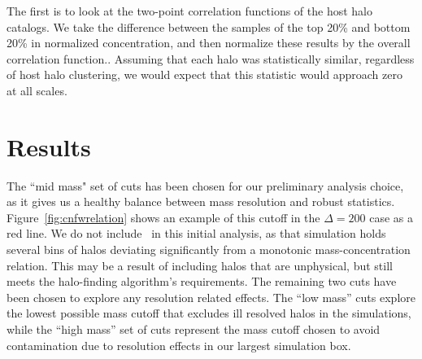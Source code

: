 \documentclass[usenatbib,usegraphicx,letterpaper]{mn2e}
\begin{document}
The first is to look at the two-point correlation functions of the host halo catalogs. We take the difference between the samples of the top 20\% and bottom 20\% in normalized concentration, and then normalize these results by the overall correlation function.. Assuming that each halo was statistically similar, regardless of host halo clustering, we would expect that this statistic would approach zero at all scales.



\section[]{Results}
\label{section:results}

The ``mid mass" set of cuts has been chosen for our preliminary analysis choice, as it gives us a healthy balance between mass resolution and robust statistics. Figure~\ref{fig:cnfwrelation} shows an example of this cutoff in the $\Delta = 200$ case as a red line. 
We do not include \simC \ in this initial analysis, as that simulation holds several bins of halos deviating significantly from a monotonic mass-concentration relation. This may be a result of including halos that are unphysical, but still meets the halo-finding algorithm's requirements.  The remaining two cuts have been chosen to explore any resolution related effects. The ``low mass'' cuts explore the lowest possible mass cutoff that excludes ill resolved halos in the \citet{diemer15} simulations, while the ``high mass'' set of cuts represent the mass cutoff chosen to avoid contamination due to resolution effects in our largest simulation box.
\end{document}
